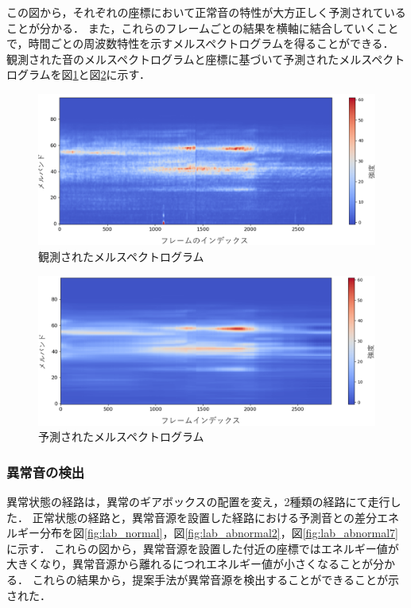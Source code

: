 \documentclass[../main]{subfiles}
\begin{document}
この図から，それぞれの座標において正常音の特性が大方正しく予測されていることが分かる．
また，これらのフレームごとの結果を横軸に結合していくことで，時間ごとの周波数特性を示すメルスペクトログラムを得ることができる．
観測された音のメルスペクトログラムと座標に基づいて予測されたメルスペクトログラムを図\ref{fig:observed_mel}と図\ref{fig:predicted_mel}に示す．

\begin{figure}[t]
  \centering
  \includegraphics[keepaspectratio, width=0.7\linewidth]{chap4/observed_mel.png}
  \caption{観測されたメルスペクトログラム}
  \label{fig:observed_mel}
\end{figure}

\begin{figure}[t]
  \centering
  \includegraphics[keepaspectratio, width=0.7\linewidth]{chap4/predicted_mel.png}
  \caption{予測されたメルスペクトログラム}
  \label{fig:predicted_mel}
\end{figure}


\subsubsection{異常音の検出} \label{subsubsec:anomaly_detection}
異常状態の経路は，異常のギアボックスの配置を変え，2種類の経路にて走行した．
正常状態の経路と，異常音源を設置した経路における予測音との差分エネルギー分布を図\ref{fig:lab_normal}，図\ref{fig:lab_abnormal2}，図\ref{fig:lab_abnormal7}に示す．
これらの図から，異常音源を設置した付近の座標ではエネルギー値が大きくなり，異常音源から離れるにつれエネルギー値が小さくなることが分かる．
これらの結果から，提案手法が異常音源を検出することができることが示された．
\end{document}
